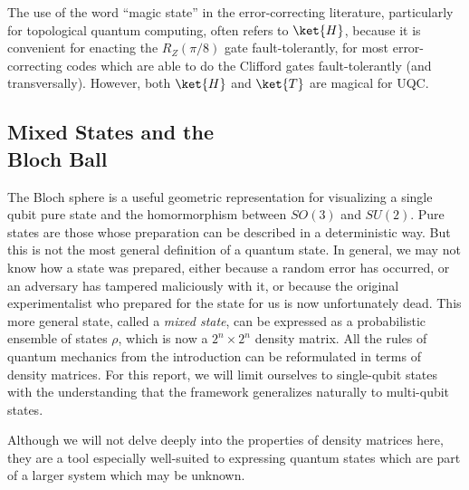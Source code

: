 The use of the word ``magic state'' in the error-correcting literature,
particularly for topological quantum computing, often refers to $\ket{H}$,
because it is convenient for enacting the $R_Z(\pi/8)$ gate fault-tolerantly,
for most error-correcting codes which are able to do
the Clifford gates fault-tolerantly (and transversally).
However, both $\ket{H}$ and $\ket{T}$ are magical for \textsc{UQC}.


\subsection{Mixed States and the\\ Bloch Ball}

The Bloch sphere is a useful geometric representation for visualizing
a single qubit pure state and the homormorphism between $SO(3)$ and $SU(2)$.
Pure states are those whose preparation can
be described in a deterministic way. But this is not the most general definition
of a quantum state. In general, we may not know how a state was prepared,
either because a random error has occurred, or an adversary has tampered
maliciously with it, or because the original experimentalist who prepared
for the state for us is now unfortunately dead. This more general state,
called a \emph{mixed state}, can be expressed as a probabilistic ensemble of
states $\rho$, which is now a $2^n \times 2^n$ density matrix. All the
rules of quantum mechanics from the introduction can be reformulated in
terms of density matrices. For this report,
we will limit ourselves to single-qubit states with the understanding that
the framework generalizes naturally to multi-qubit states.

Although we
will not delve deeply into the properties of density matrices here, they are
a tool especially well-suited to expressing quantum states which are part
of a larger system which may be unknown.


